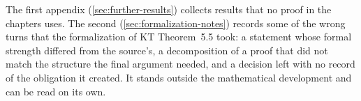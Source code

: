 The first appendix (\cref{sec:further-results}) collects results that
no proof in the chapters uses. The second (\cref{sec:formalization-notes})
records some of the wrong turns that the formalization of KT
Theorem~5.5 took: a statement whose formal strength differed from the
source's, a decomposition of a proof that did not match the structure
the final argument needed, and a decision left with no record of the
obligation it created. It stands outside the mathematical development
and can be read on its own.
